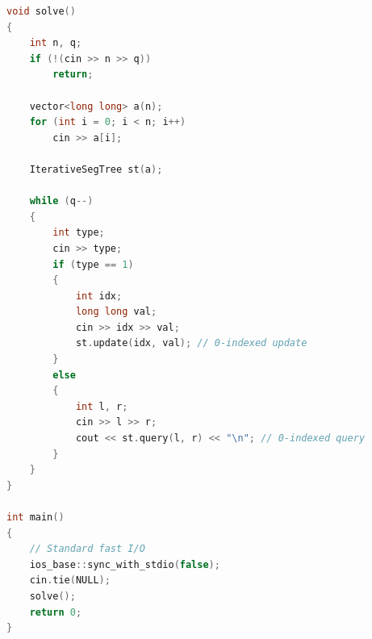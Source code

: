 \documentclass[10pt,landscape,a4paper,twocolumn]{article}
\begin{document}
\begin{lstlisting}[language=C++]
void solve()
{
    int n, q;
    if (!(cin >> n >> q))
        return;

    vector<long long> a(n);
    for (int i = 0; i < n; i++)
        cin >> a[i];

    IterativeSegTree st(a);

    while (q--)
    {
        int type;
        cin >> type;
        if (type == 1)
        {
            int idx;
            long long val;
            cin >> idx >> val;
            st.update(idx, val); // 0-indexed update
        }
        else
        {
            int l, r;
            cin >> l >> r;
            cout << st.query(l, r) << "\n"; // 0-indexed query
        }
    }
}

int main()
{
    // Standard fast I/O
    ios_base::sync_with_stdio(false);
    cin.tie(NULL);
    solve();
    return 0;
}
\end{lstlisting}
\end{document}
